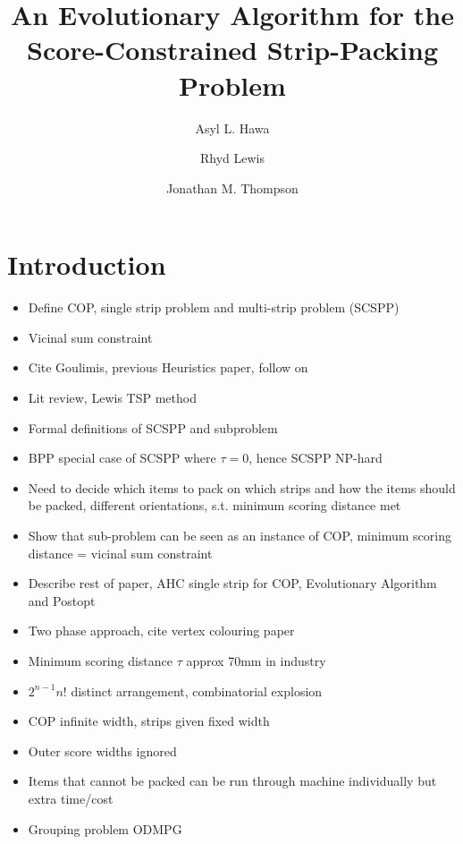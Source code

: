 \documentclass{elsarticle}
\begin{document}
	
\begin{frontmatter}
\title{An Evolutionary Algorithm for the Score-Constrained Strip-Packing Problem}
\author{Asyl L. Hawa}
\author{Rhyd Lewis}
\author{Jonathan M. Thompson}
\address{School of Mathematics, Cardiff University, Senghennydd Road, Cardiff, UK}

\end{frontmatter}


\section{Introduction}
\begin{itemize}
	\item Define COP, single strip problem and multi-strip problem (SCSPP)
	\item Vicinal sum constraint
	\item Cite Goulimis, previous Heuristics paper, follow on
	\item Lit review, Lewis TSP method
	\item Formal definitions of SCSPP and subproblem
	\item BPP special case of SCSPP where $\tau = 0$, hence SCSPP NP-hard
	\item Need to decide which items to pack on which strips and how the items should be packed, different orientations, s.t. minimum scoring distance met
	\item Show that sub-problem can be seen as an instance of COP, minimum scoring distance = vicinal sum constraint
	\item Describe rest of paper, AHC single strip for COP, Evolutionary Algorithm and Postopt
	\item Two phase approach, cite vertex colouring paper
	\item Minimum scoring distance $\tau$ approx 70mm in industry
	\item $2^{n-1} n!$ distinct arrangement, combinatorial explosion
	\item COP infinite width, strips given fixed width
	\item Outer score widths ignored
	\item Items that cannot be packed can be run through machine individually but extra time/cost
	\item Grouping problem ODMPG 
\end{itemize}
\end{document}
